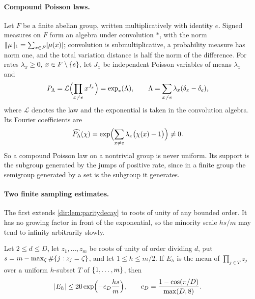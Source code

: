 \paragraph{Compound Poisson laws.} Let $F$ be a finite abelian group, written multiplicatively with
identity $e$. Signed measures on $F$ form an algebra under convolution $*$, with the norm
$\lVert\mu\rVert_1=\sum_{x\in F}\lvert\mu(x)\rvert$; convolution is submultiplicative, a probability measure has
norm one, and the total variation distance is half the norm of the difference. For rates $\lambda_x\ge0$,
$x\in F\setminus\{e\}$, let $J_x$ be independent Poisson variables of means $\lambda_x$ and
\begin{equation}\label{dir:eq:cp}
 P_\Lambda=\mathcal L\Bigl(\prod_{x\ne e}x^{J_x}\Bigr)=\exp_*(\Lambda),\qquad
 \Lambda=\sum_{x\ne e}\lambda_x(\delta_x-\delta_e),
\end{equation}
where $\mathcal L$ denotes the law and the exponential is taken in the convolution algebra. Its Fourier
coefficients are
\begin{equation}\label{dir:eq:cpfourier}
 \widehat{P_\Lambda}(\chi)=\exp\Bigl(\sum_{x\ne e}\lambda_x\bigl(\chi(x)-1\bigr)\Bigr)\ne0 .
\end{equation}
So a compound Poisson law on a nontrivial group is never uniform. Its support is the subgroup generated by
the jumps of positive rate, since in a finite group the semigroup generated by a set is the subgroup it
generates.

\paragraph{Two finite sampling estimates.} The first extends \cref{dir:lem:paritydecay} to roots of
unity of any bounded order. It has no growing factor in front of the exponential, so the minority scale
$hs/m$ may tend to infinity arbitrarily slowly.

\begin{lemma}\label{dir:lem:splitpair}
Let $2\le d\le D$, let $z_1,\dots,z_m$ be roots of unity of order dividing $d$, put
$s=m-\max_\zeta\#\{j:z_j=\zeta\}$, and let $1\le h\le m/2$. If $E_h$ is the mean of $\prod_{j\in T}z_j$
over a uniform $h$-subset $T$ of $\{1,\dots,m\}$, then
\begin{equation}\label{dir:eq:splitpair}
 \lvert E_h\rvert\le20\exp\Bigl(-c_D\frac{hs}m\Bigr),\qquad c_D=\frac{1-\cos(\pi/D)}{\max(D,8)} .
\end{equation}
\end{lemma}

